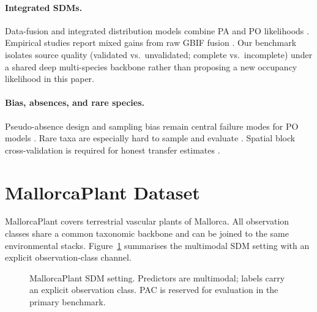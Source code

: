 \documentclass[11pt,letterpaper]{article}
\begin{document}
\paragraph{Integrated SDMs.}
Data-fusion and integrated distribution models combine PA and PO likelihoods \citep{isaac2020data,fletcher2019practical,Grattarola2023,Datafusion2025}.
Empirical studies report mixed gains from raw GBIF fusion \citep{Datafusion2025,atsumi2024boosting}.
Our benchmark isolates source quality (validated vs.\ unvalidated; complete vs.\ incomplete) under a shared deep multi-species backbone rather than proposing a new occupancy likelihood in this paper.

\paragraph{Bias, absences, and rare species.}
Pseudo-absence design and sampling bias remain central failure modes for PO models \citep{barbet2012selecting,chefaoui2008assessing,lobo2010uncertain,phillips2009sample}.
Rare taxa are especially hard to sample and evaluate \citep{jeliazkov2022rare}.
Spatial block cross-validation is required for honest transfer estimates \citep{KOLDASBAYEVA2025103521}.


\section{MallorcaPlant Dataset}
\label{sec:dataset}

MallorcaPlant covers terrestrial vascular plants of Mallorca.
All observation classes share a common taxonomic backbone and can be joined to the same environmental stacks.
Figure~\ref{fig:overview} summarises the multimodal SDM setting with an explicit observation-class channel.

\begin{figure}[t]
  \centering
  \caption{MallorcaPlant SDM setting. Predictors are multimodal; labels carry an explicit observation class. PAC is reserved for evaluation in the primary benchmark.}
  \label{fig:overview}
\end{figure}
\end{document}
